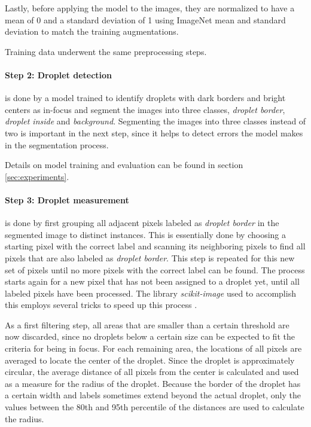 Lastly, before applying the model to the images, they are normalized to have a mean of 0 and a standard deviation of 1 using ImageNet mean and standard deviation to match the training augmentations.

Training data underwent the same preprocessing steps.

\paragraph{Step 2: Droplet detection} is done by a model trained to identify droplets with dark borders and bright centers as in-focus and segment the images into three classes, \emph{droplet border}, \emph{droplet inside} and \emph{background}.
Segmenting the images into three classes instead of two is important in the next step, since it helps to detect errors the model makes in the segmentation process.

Details on model training and evaluation can be found in section \ref{sec:experiments}.

\paragraph{Step 3: Droplet measurement} is done by first grouping all adjacent pixels labeled as \emph{droplet border} in the segmented image to distinct instances. 
This is essentially done by choosing a starting pixel with the correct label and scanning its neighboring pixels to find all pixels that are also labeled as \emph{droplet border}.
This step is repeated for this new set of pixels until no more pixels with the correct label can be found.
The process starts again for a new pixel that has not been assigned to a droplet yet, until all labeled pixels have been processed.
The library \emph{scikit-image}\cite{waltScikitimageImageProcessing2014} used to accomplish this employs several tricks to speed up this process \cite{wuOptimizingConnectedComponent2005}. 

As a first filtering step, all areas that are smaller than a certain threshold are now discarded, since no droplets below a certain size can be expected to fit the criteria for being in focus.
For each remaining area, the locations of all pixels are averaged to locate the center of the droplet.
Since the droplet is approximately circular, the average distance of all pixels from the center is calculated and used as a measure for the radius of the droplet.
Because the border of the droplet has a certain width and labels sometimes extend beyond the actual droplet, only the values between the 80th and 95th percentile of the distances are used to calculate the radius.

